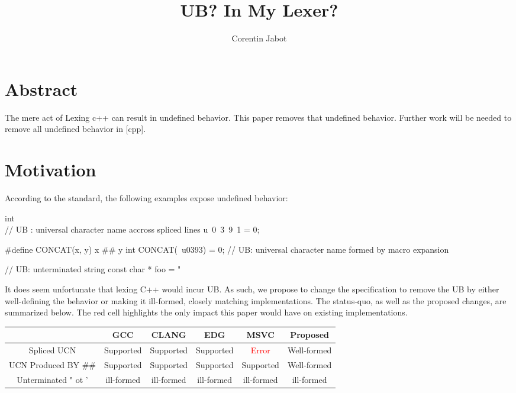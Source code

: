 \documentclass{wg21}
\title{UB? In My Lexer?}
\author{Corentin Jabot}{corentin.jabot@gmail.com}
\begin{document}
\maketitle

\section{Abstract}

The mere act of Lexing c++ can result in undefined behavior.
This paper removes that undefined behavior.
Further work will be needed to remove all undefined behavior in [cpp].

\section {Motivation}

According to the standard, the following examples expose undefined behavior:

\begin{colorblock}
int \\ // UB : universal character name accross spliced lines
u\
0\
3\
9\
1 = 0;


#define CONCAT(x, y) x ## y
int CONCAT(\, u0393) = 0; // UB: universal character name formed by macro expansion

// UB: unterminated string
const char * foo = "
\end{colorblock}

It does seem unfortunate that lexing C++ would incur UB.
As such, we propose to change the specification to remove the UB by either well-defining the behavior or making it ill-formed,
closely matching implementations.
The status-quo, as well as the proposed changes, are summarized below.
The red cell highlights the only impact this paper would have on existing implementations.

\renewcommand*\arraystretch{1.4}
\begin{tabular}{|c|c|c|c|c|c|}
     \cline{2-6}
    \multicolumn{1}{c|}{} & GCC & CLANG & EDG & MSVC & Proposed \\
    \hline
    Spliced UCN & Supported & Supported & Supported & \textcolor{red}{Error} & Well-formed \\
    \hline
    UCN Produced BY \#\# & Supported & Supported & Supported & Supported & Well-formed \\
    \hline
    Unterminated " ot ' & ill-formed & ill-formed & ill-formed & ill-formed & ill-formed \\
    \hline
\end{tabular}\\
\end{document}
